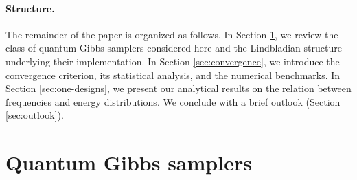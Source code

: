 \documentclass[showpacs,amsmath,amssymb,twocolumn,prx,superscriptaddress,10pt,aps,nofootinbib]{revtex4-2}
\begin{document}
\paragraph{Structure.} The remainder of the paper is organized as follows. In Section \ref{sec:qgs}, we review the class of quantum Gibbs samplers considered here and the Lindbladian structure underlying their implementation. In Section \ref{sec:convergence}, we introduce the convergence criterion, its statistical analysis, and the numerical benchmarks. In Section \ref{sec:one-designs}, we present our analytical results on the relation between frequencies and energy distributions. We conclude with a brief outlook (Section \ref{sec:outlook}).


\section{Quantum Gibbs samplers}
\label{sec:qgs}
\end{document}
